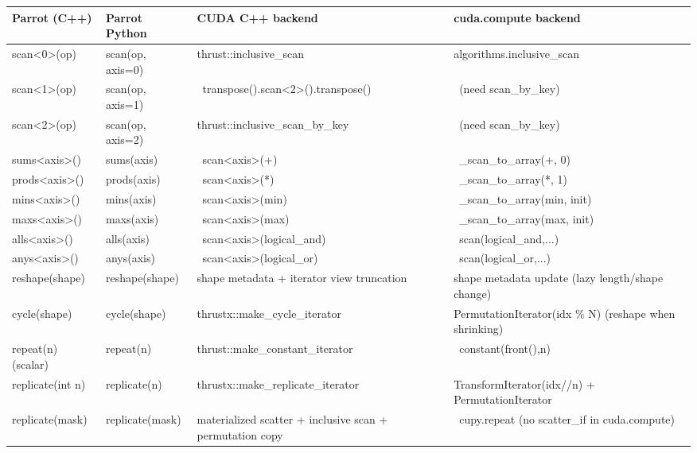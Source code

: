 \documentclass[10pt]{article}
\newcommand{\parrotemoji}{{\emojifont\normalsize\symbol{"1F99C}}}
\newcommand{\notemoji}{{\emojifont\normalsize\symbol{"26D4}}}
\newcommand{\parrotimpl}{\parrotemoji}
\newcommand{\notimpl}{\notemoji}
\begin{document}
\noindent\begin{minipage}{\textwidth}
\captionsetup{skip=4pt}
\label{tab:api-map-2}
\footnotesize\ttfamily
\renewcommand{\arraystretch}{1.15}
\begin{tabularx}{\textwidth}{ll>{\raggedright\arraybackslash}X>{\raggedright\arraybackslash}X}
\toprule
\textrm{\textbf{Parrot (C++)}} & \textrm{\textbf{Parrot Python}} & \textrm{\textbf{CUDA C++ backend}} & \textrm{\textbf{cuda.compute backend}} \\
\midrule
scan<0>(op) & scan(op, axis=0) & thrust::inclusive\_scan & algorithms.inclusive\_scan \\
scan<1>(op) & scan(op, axis=1) & \parrotimpl\ transpose().scan<2>().transpose() & \notimpl\ (need scan\_by\_key) \\
scan<2>(op) & scan(op, axis=2) & thrust::inclusive\_scan\_by\_key & \notimpl\ (need scan\_by\_key) \\
sums<axis>() & sums(axis) & \parrotimpl\ scan<axis>(+) & \parrotimpl\ \_scan\_to\_array(+, 0) \\
prods<axis>() & prods(axis) & \parrotimpl\ scan<axis>(*) & \parrotimpl\ \_scan\_to\_array(*, 1) \\
mins<axis>() & mins(axis) & \parrotimpl\ scan<axis>(min) & \parrotimpl\ \_scan\_to\_array(min, init) \\
maxs<axis>() & maxs(axis) & \parrotimpl\ scan<axis>(max) & \parrotimpl\ \_scan\_to\_array(max, init) \\
alls<axis>() & alls(axis) & \parrotimpl\ scan<axis>(logical\_and) & \parrotimpl\ scan(logical\_and,...) \\
anys<axis>() & anys(axis) & \parrotimpl\ scan<axis>(logical\_or) & \parrotimpl\ scan(logical\_or,...) \\
reshape(shape) & reshape(shape) & shape metadata + iterator view truncation & shape metadata update (lazy length/shape change) \\
cycle(shape) & cycle(shape) & thrustx::make\_cycle\_iterator & PermutationIterator(idx \% N) (reshape when shrinking) \\
repeat(n) (scalar) & repeat(n) & thrust::make\_constant\_iterator & \parrotimpl\ constant(front(),n) \\
replicate(int n) & replicate(n) & thrustx::make\_replicate\_iterator & TransformIterator(idx//n) + PermutationIterator \\
replicate(mask) & replicate(mask) & materialized scatter + inclusive scan + permutation copy & \parrotimpl\ cupy.repeat (no scatter\_if in cuda.compute) \\

\end{tabularx}
\end{minipage}
\end{document}
